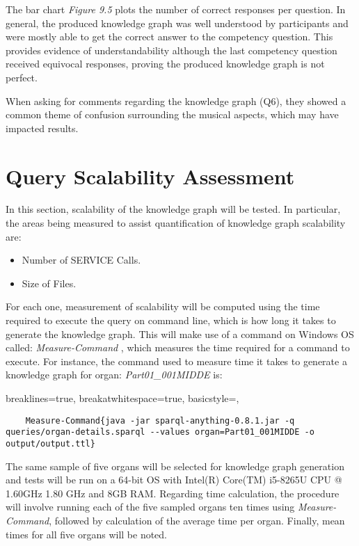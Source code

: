 The bar chart \textit{Figure 9.5} plots the number of correct responses per question. In general, the produced knowledge graph was well understood by participants and were mostly able to get the correct answer to the competency question. This provides evidence of understandability although the last competency question received equivocal responses, proving the produced knowledge graph is not perfect. 

When asking for comments regarding the knowledge graph (Q6), they showed a common theme of confusion surrounding the musical aspects, which may have impacted results. 

\section{Query Scalability Assessment}
In this section, scalability of the knowledge graph will be tested. In particular, the areas being measured to assist quantification of knowledge graph scalability are: 

\vspace{-0.1cm}
\begin{itemize}
\itemsep0cm
    \item Number of SERVICE Calls.
    \vspace{-0.1cm}
    \item Size of Files.
\end{itemize}
\vspace{-0.1cm}

For each one, measurement of scalability will be computed using the time required to execute the query on command line, which is how long it takes to generate the knowledge graph. This will make use of a command on Windows OS called: \textit{Measure-Command} \cite{measurecommand}, which measures the time required for a command to execute. For instance, the command used to measure time it takes to generate a knowledge graph for organ: \textit{Part01\_001MIDDE} is:

\lstset
{
    breaklines=true,
    breakatwhitespace=true,
    basicstyle=\linespread{1.5}\ttfamily,
}
\begin{lstlisting}
    Measure-Command{java -jar sparql-anything-0.8.1.jar -q queries/organ-details.sparql --values organ=Part01_001MIDDE -o output/output.ttl}
\end{lstlisting}

The same sample of five organs will be selected for knowledge graph generation and tests will be run on a 64-bit OS with Intel(R) Core(TM) i5-8265U CPU @ 1.60GHz 1.80 GHz and 8GB RAM. Regarding time calculation, the procedure will involve running each of the five sampled organs ten times using \textit{Measure-Command}, followed by calculation of the average time per organ. Finally, mean times for all five organs will be noted.

